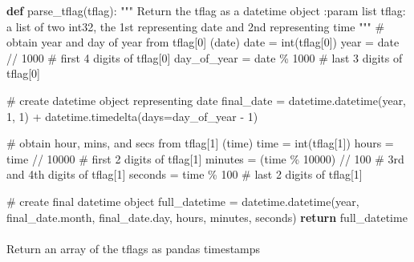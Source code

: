 \documentclass[
  letterpaper,
  DIV=11,
  numbers=noendperiod]{scrreprt}
\makeatletter
\let\oldparagraph\paragraph
\renewcommand{\paragraph}{
    \@ifstar
      \xxxParagraphStar
      \xxxParagraphNoStar
  }
\newcommand{\xxxParagraphStar}[1]{\oldparagraph*{#1}\mbox{}}
\newcommand{\xxxParagraphNoStar}[1]{\oldparagraph{#1}\mbox{}}
\newenvironment{Shaded}{\begin{snugshade}}{\end{snugshade}}
\newcommand{\BuiltInTok}[1]{\textcolor[rgb]{0.00,0.23,0.31}{#1}}
\newcommand{\CommentTok}[1]{\textcolor[rgb]{0.37,0.37,0.37}{#1}}
\newcommand{\ControlFlowTok}[1]{\textcolor[rgb]{0.00,0.23,0.31}{\textbf{#1}}}
\newcommand{\DecValTok}[1]{\textcolor[rgb]{0.68,0.00,0.00}{#1}}
\newcommand{\KeywordTok}[1]{\textcolor[rgb]{0.00,0.23,0.31}{\textbf{#1}}}
\newcommand{\NormalTok}[1]{\textcolor[rgb]{0.00,0.23,0.31}{#1}}
\newcommand{\OperatorTok}[1]{\textcolor[rgb]{0.37,0.37,0.37}{#1}}
\makeatother
\begin{document}
\begin{Shaded}
\begin{Highlighting}[]
\KeywordTok{def}\NormalTok{ parse\_tflag(tflag):}
    \CommentTok{"""}
\CommentTok{    Return the tflag as a datetime object}
\CommentTok{    :param list tflag: a list of two int32, the 1st representing date and 2nd representing time}
\CommentTok{    """}
    \CommentTok{\# obtain year and day of year from tflag[0] (date)}
\NormalTok{    date }\OperatorTok{=} \BuiltInTok{int}\NormalTok{(tflag[}\DecValTok{0}\NormalTok{])}
\NormalTok{    year }\OperatorTok{=}\NormalTok{ date }\OperatorTok{//} \DecValTok{1000} \CommentTok{\# first 4 digits of tflag[0]}
\NormalTok{    day\_of\_year }\OperatorTok{=}\NormalTok{ date }\OperatorTok{\%} \DecValTok{1000} \CommentTok{\# last 3 digits of tflag[0]}

    \CommentTok{\# create datetime object representing date}
\NormalTok{    final\_date }\OperatorTok{=}\NormalTok{ datetime.datetime(year, }\DecValTok{1}\NormalTok{, }\DecValTok{1}\NormalTok{) }\OperatorTok{+}\NormalTok{ datetime.timedelta(days}\OperatorTok{=}\NormalTok{day\_of\_year }\OperatorTok{{-}} \DecValTok{1}\NormalTok{)}

    \CommentTok{\# obtain hour, mins, and secs from tflag[1] (time)}
\NormalTok{    time }\OperatorTok{=} \BuiltInTok{int}\NormalTok{(tflag[}\DecValTok{1}\NormalTok{])}
\NormalTok{    hours }\OperatorTok{=}\NormalTok{ time }\OperatorTok{//} \DecValTok{10000} \CommentTok{\# first 2 digits of tflag[1]}
\NormalTok{    minutes }\OperatorTok{=}\NormalTok{ (time }\OperatorTok{\%} \DecValTok{10000}\NormalTok{) }\OperatorTok{//} \DecValTok{100} \CommentTok{\# 3rd and 4th digits of tflag[1] }
\NormalTok{    seconds }\OperatorTok{=}\NormalTok{ time }\OperatorTok{\%} \DecValTok{100}  \CommentTok{\# last 2 digits of tflag[1]}

    \CommentTok{\# create final datetime object}
\NormalTok{    full\_datetime }\OperatorTok{=}\NormalTok{ datetime.datetime(year, final\_date.month, final\_date.day, hours, minutes, seconds)}
    \ControlFlowTok{return}\NormalTok{ full\_datetime}
\end{Highlighting}
\end{Shaded}

\paragraph{Return an array of the tflags as pandas
timestamps}\label{return-an-array-of-the-tflags-as-pandas-timestamps}
\end{document}

